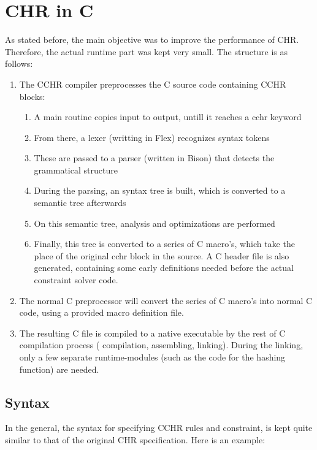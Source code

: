 \documentclass{llncs}
\begin{document}
\section{CHR in C}

As stated before, the main objective was to improve the performance of CHR. Therefore, the actual
runtime part was kept very small. The structure is as follows: \begin{enumerate}
  \item The CCHR compiler preprocesses the C source code containing CCHR blocks: \begin{enumerate}
    \item A main routine copies input to output, untill it reaches a cchr keyword
    \item From there, a lexer (writting in Flex) recognizes syntax tokens
    \item These are passed to a parser (written in Bison) that detects the grammatical structure
    \item During the parsing, an syntax tree is built, which is converted to a semantic tree afterwards
    \item On this semantic tree, analysis and optimizations are performed
    \item Finally, this tree is converted to a series of C macro's, which take the place of the
          original cchr block in the source. A C header file is also generated, containing some early
	  definitions needed before the actual constraint solver code.
  \end{enumerate}
  \item The normal C preprocessor will convert the series of C macro's into normal C code, using a
        provided macro definition file.
  \item The resulting C file is compiled to a native executable by the rest of C compilation process (
        compilation, assembling, linking). During the linking, only a few separate runtime-modules (such as
	the code for the hashing function) are needed.
\end{enumerate}

\subsection{Syntax}

In the general, the syntax for specifying CCHR rules and constraint, is kept quite similar to that
of the original CHR specification. Here is an example:
\end{document}
